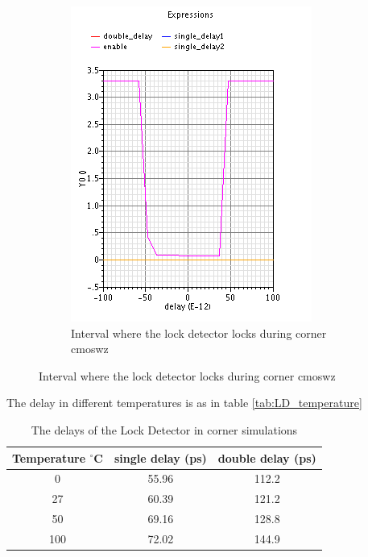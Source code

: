 \documentclass[a4paper,12pt]{article} \usepackage{graphicx}
\newcommand{\degree}{\ensuremath{^\circ}}
\begin{document}
\begin{figure}
\begin{subfigure}[b]{.5\textwidth}
        \centering
        \includegraphics[width=\textwidth]{../Bilder/LD_tran/PD_wz.png}
        \caption{Interval where the lock detector locks during corner cmoswz}
        \label{fig:LD_wz}
\end{subfigure}
\end{figure}

The delay in different temperatures is as in table \ref{tab:LD_temperature}
\begin{table}[h]
        \centering
        \begin{tabular}{|c|c|c|}
                \hline
                \textbf{Temperature $\degree$C} & \textbf{single delay
                  (ps)} & \textbf{double delay (ps)} \\
                \hline
                0 & 55.96 & 112.2 \\
                27 & 60.39 & 121.2 \\
                50 & 69.16 & 128.8 \\
                100 & 72.02 & 144.9 \\
                \hline
        \end{tabular}
        \caption{The delays of the Lock Detector in corner simulations}
        \label{tab:LD_temperture}
\end{table}
\end{document}
